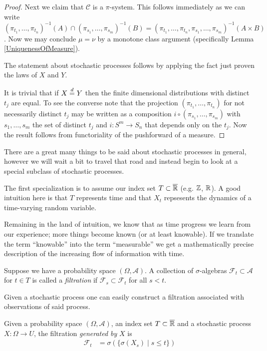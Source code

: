 \begin{proof}
Next we claim that $\mathcal{C}$ is a $\pi$-system.  This follows
immediately as we can write $(\pi_{t_1},\dotsc, \pi_{t_n})^{-1}(A)
\cap (\pi_{s_1},\dotsc, \pi_{s_m})^{-1}(B) = (\pi_{t_1},\dotsc,
\pi_{t_n}, \pi_{s_1},\dotsc, \pi_{s_m})^{-1}(A \times B)$.  Now we may
conclude $\mu = \nu$
by a monotone class argument (specifically Lemma \ref{UniquenessOfMeasure}).

The statement about stochastic processes follows by applying the fact just proven the laws
of $X$ and $Y$.

It is trivial that if $X \overset{d}= Y$ then the finite dimensional
distributions with distinct $t_j$ are equal.  To see the converse note
that the projection $(\pi_{t_1},\dotsc,  \pi_{t_n})$ for not necessarily distinct $t_j$ may be written
as a composition $i \circ (\pi_{s_1}, \dotsc, \pi_{s_m})$ with $s_1,
\dotsc, s_m$ the set of distinct $t_j$ and $i : S^m \to S_n$ that
depends only on the $t_j$.  Now the result follows from functoriality
of the pushforward of a measure.
\end{proof}


There are a great many things to be said about stochastic processes in
general, however we will wait a bit to travel that road and instead begin to
look at a special subclass of stochastic processes.

The first specialization is to assume our index set $T \subset \overline{\mathbb{R}}$ (e.g. $\mathbb{Z}$,
$\mathbb{R}$).  A good intuition here is that $T$ represents time and that
$X_t$ repsesents the dynamics of a time-varying random variable.

Remaining in the land of intuition, we know that as time progress we
learn from our experience; more things become known (or at least
knowable).  If we translate the term ``knowable'' into the term
``measurable'' we get a mathematically precise description of the
increasing flow of information with time.
\begin{defn}Suppose we have a probability space $(\Omega,
  \mathcal{A})$.  A collection of $\sigma$-algebras $\mathcal{F}_t
  \subset \mathcal{A}$ for $t
  \in T$ is called a \emph{filtration} if $\mathcal{F}_s \subset
  \mathcal{F}_t$ for all $s < t$.
\end{defn}

Given a stochastic process one can easily construct a filtration
associated with observations of said process.
\begin{defn}Given a probability space $(\Omega,  \mathcal{A})$, an
  index set $T \subset \overline{\mathbb{R}}$ and a stochastic process $X
  : \Omega \to U$, the filtration \emph{generated by} $X$ is 
\begin{align*}
\mathcal{F}_t &= \sigma(\lbrace \sigma(X_s) \mid s \leq t \rbrace)
\end{align*}
\end{defn}

